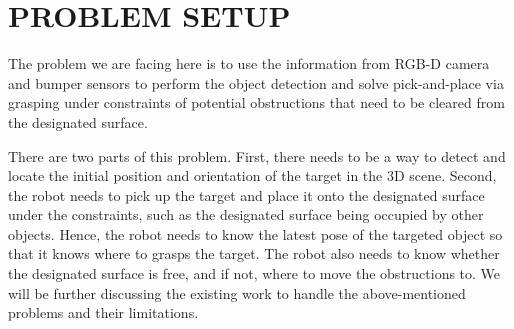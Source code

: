 \section{PROBLEM SETUP}
The problem we are facing here is to use the information from RGB-D camera and bumper sensors to perform the object detection and solve pick-and-place via grasping under constraints of potential obstructions that need to be cleared from the designated surface. 

There are two parts of this problem. First, there needs to be a way to detect and locate the initial position and orientation of the target in the 3D scene. Second, the robot needs to pick up the target and place it onto the designated surface under the constraints, such as the designated surface being occupied by other objects. Hence, the robot needs to know the latest pose of the targeted object so that it knows where to grasps the target. The robot also needs to know whether the designated surface is free, and if not, where to move the obstructions to. We will be further discussing the existing work to handle the above-mentioned problems and their limitations.